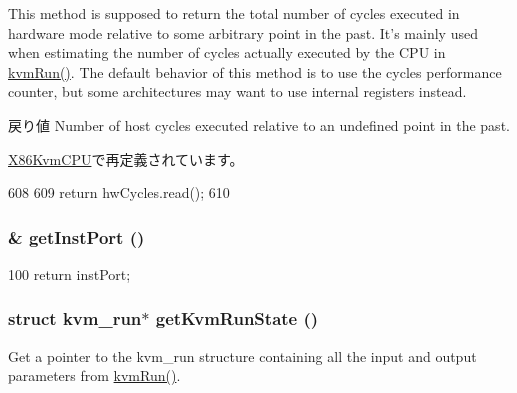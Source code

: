 This method is supposed to return the total number of cycles executed in hardware mode relative to some arbitrary point in the past. It's mainly used when estimating the number of cycles actually executed by the CPU in \hyperlink{classBaseKvmCPU_aed3dbd0c0bf26d82ee56367a3f350506}{kvmRun()}. The default behavior of this method is to use the cycles performance counter, but some architectures may want to use internal registers instead.

\begin{DoxyReturn}{戻り値}
Number of host cycles executed relative to an undefined point in the past. 
\end{DoxyReturn}


\hyperlink{classX86KvmCPU_abcad2a22057ba48360b17b978f694b48}{X86KvmCPU}で再定義されています。


\begin{DoxyCode}
608 {
609     return hwCycles.read();
610 }
\end{DoxyCode}
\hypertarget{classBaseKvmCPU_ab8ce6baf7cb0aaaf4ca346896a86fa03}{
\subsubsection[{getInstPort}]{\& getInstPort ()}}
\label{classBaseKvmCPU_ab8ce6baf7cb0aaaf4ca346896a86fa03}



\begin{DoxyCode}
100 { return instPort; }
\end{DoxyCode}
\hypertarget{classBaseKvmCPU_ae544593d8bd3763ec6cf4cc7d0fd614b}{
\subsubsection[{getKvmRunState}]{\setlength{\rightskip}{0pt plus 5cm}struct kvm\_\-run$\ast$ getKvmRunState ()}}
\label{classBaseKvmCPU_ae544593d8bd3763ec6cf4cc7d0fd614b}
Get a pointer to the kvm\_\-run structure containing all the input and output parameters from \hyperlink{classBaseKvmCPU_aed3dbd0c0bf26d82ee56367a3f350506}{kvmRun()}. 


